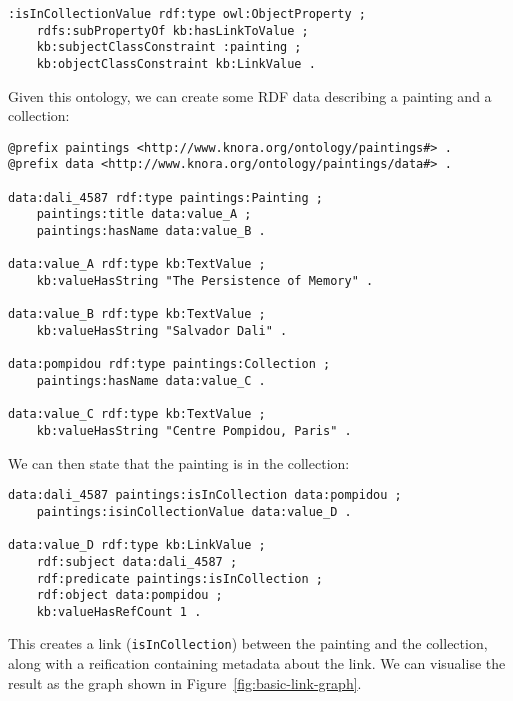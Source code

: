 \documentclass[12pt, a4paper]{article}
\begin{document}
\begin{verbatim}
:isInCollectionValue rdf:type owl:ObjectProperty ;
    rdfs:subPropertyOf kb:hasLinkToValue ;
    kb:subjectClassConstraint :painting ;
    kb:objectClassConstraint kb:LinkValue .
\end{verbatim}

Given this ontology, we can create some RDF data describing a painting and a collection:

\begin{verbatim}
@prefix paintings <http://www.knora.org/ontology/paintings#> .
@prefix data <http://www.knora.org/ontology/paintings/data#> .

data:dali_4587 rdf:type paintings:Painting ;
    paintings:title data:value_A ;
    paintings:hasName data:value_B .

data:value_A rdf:type kb:TextValue ;
    kb:valueHasString "The Persistence of Memory" .
                
data:value_B rdf:type kb:TextValue ;
    kb:valueHasString "Salvador Dali" .
                
data:pompidou rdf:type paintings:Collection ;
    paintings:hasName data:value_C .
                
data:value_C rdf:type kb:TextValue ;
    kb:valueHasString "Centre Pompidou, Paris" .
\end{verbatim}

We can then state that the painting is in the collection:

\begin{verbatim}
data:dali_4587 paintings:isInCollection data:pompidou ;
    paintings:isinCollectionValue data:value_D .

data:value_D rdf:type kb:LinkValue ;
    rdf:subject data:dali_4587 ;
    rdf:predicate paintings:isInCollection ;
    rdf:object data:pompidou ;
    kb:valueHasRefCount 1 .
\end{verbatim}

This creates a link (\texttt{isInCollection}) between the painting and the collection, along with a reification containing metadata about the link. We can visualise the result as the graph shown in Figure~\ref{fig:basic-link-graph}.
\end{document}
